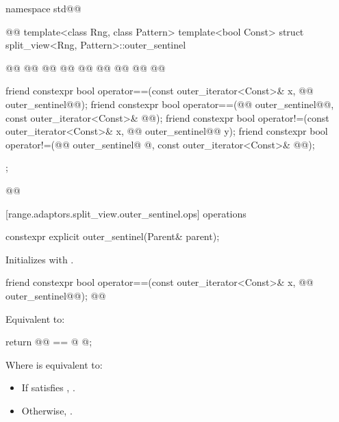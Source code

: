 \begin{codeblock}
namespace std@@ { @@
  template<class Rng, class Pattern>
  template<bool Const>
  struct split_view<Rng, Pattern>::outer_sentinel { @\newtxt{// \expos}@
  @@
    @@
      @@
    @@
    @@
  @@
    @@
    @@

    friend constexpr bool operator==(const outer_iterator<Const>& x, @@ outer_sentinel@@);
    friend constexpr bool operator==(@@ outer_sentinel@@, const outer_iterator<Const>& @@);
    friend constexpr bool operator!=(const outer_iterator<Const>& x, @@ outer_sentinel@\oldtxt{\&}@ y);
    friend constexpr bool operator!=(@@ outer_sentinel@ @, const outer_iterator<Const>& @@);
  };
}@\oldtxt{\}}@
\end{codeblock}

[range.adaptors.split_view.outer_sentinel.ops]{ operations}

{\color{oldclr}
%
\begin{itemdecl}
constexpr explicit outer_sentinel(Parent& parent);
\end{itemdecl}

\begin{itemdescr}
\pnum
\effects Initializes  with .
\end{itemdescr}
} %

%
\begin{itemdecl}
friend constexpr bool operator==(const outer_iterator<Const>& x, @@ outer_sentinel@@);
@@
\end{itemdecl}

\begin{itemdescr}
\pnum
\effects Equivalent to:
\begin{codeblock}
return @@ == @ @;
\end{codeblock}

{\color{oldclr}
Where  is equivalent to:
\begin{itemize}
\item If  satisfies , .
\item Otherwise, .
\end{itemize}
} %
\end{itemdescr}

